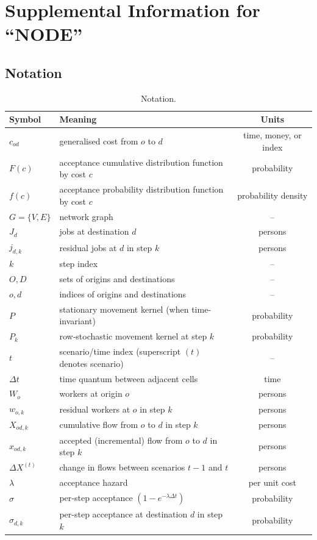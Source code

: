 \clearpage
\appendix
\section{Supplemental Information for ``NODE''}

\subsection{Notation}

\begin{table}[h]
\centering
\caption{Notation.}
\begin{tabular}{llc}
\toprule
Symbol & Meaning & Units \\
\midrule
$c_{od}$ & generalised cost from $o$ to $d$ & time, money, or index \\
$F(c)$ & acceptance cumulative distribution function by cost $c$ & probability \\
$f(c)$ & acceptance probability distribution function by cost $c$ & probability density \\
$G = \{V,E\}$ & network graph & -- \\
$J_d$ & jobs at destination $d$ & persons \\
$j_{d,k}$ & residual jobs at $d$ in step $k$ & persons \\
$k$ & step index & -- \\
$O, D$ & sets of origins and destinations & -- \\
$o, d$ & indices of origins and destinations & -- \\
$P$ & stationary movement kernel (when time-invariant) & probability \\
$P_k$ & row‑stochastic movement kernel at step $k$ & probability \\
$t$ & scenario/time index (superscript $(t)$ denotes scenario) & -- \\
$\Delta t$ & time quantum between adjacent cells & time \\
$W_o$ & workers at origin $o$ & persons \\
$w_{o,k}$ & residual workers at $o$ in step $k$ & persons \\
$X_{od,k}$ & cumulative flow from $o$ to $d$ in step $k$ & persons \\
$x_{od,k}$ & accepted (incremental) flow from $o$ to $d$ in step $k$ & persons \\
$\Delta X^{(t)}$ & change in flows between scenarios $t-1$ and $t$ & persons \\
$\lambda$ & acceptance hazard & per unit cost \\
$\sigma$ & per‑step acceptance $(1-e^{-\lambda \Delta t})$ & probability \\
$\sigma_{d,k}$ & per-step acceptance at destination $d$ in step $k$ & probability \\
\bottomrule
\end{tabular}
\end{table}

